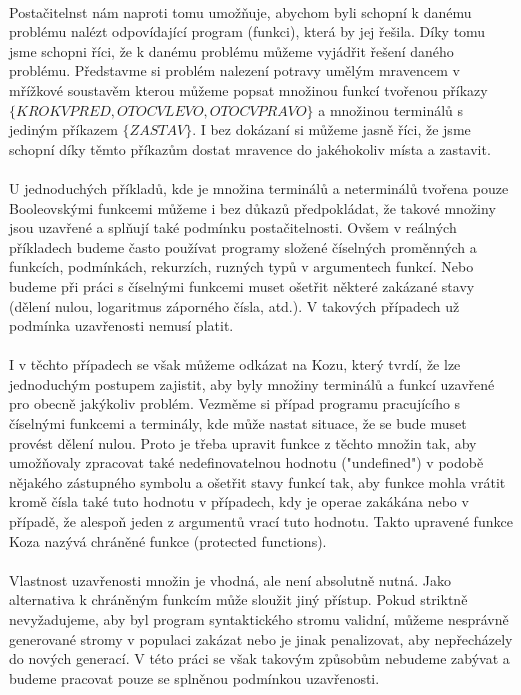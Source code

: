 \documentclass[bc,male,java,dept460]{diploma}		%
\begin{document}
\paragraph*{}
Postačitelnst nám naproti tomu umožňuje, abychom byli schopní k danému problému nalézt odpovídající program (funkci), která by jej řešila. Díky tomu jsme schopni říci, že k danému problému můžeme vyjádřit řešení daného problému. Představme si problém nalezení potravy umělým mravencem v mřížkové soustavěm kterou můžeme popsat množinou funkcí tvořenou příkazy $\{KROK VPRED, OTOC VLEVO, OTOC VPRAVO\}$ a množinou terminálů s jediným příkazem $\{ZASTAV\}$. I bez dokázaní si můžeme jasně říci, že jsme schopní díky těmto příkazům dostat mravence do jakéhokoliv místa a zastavit.

\paragraph*{}
U jednoduchých příkladů, kde je množina terminálů a neterminálů tvořena pouze Booleovskými funkcemi můžeme i bez důkazů předpokládat, že takové množiny jsou uzavřené a splňují také podmínku postačitelnosti. Ovšem v reálných příkladech budeme často používat programy složené číselných proměnných a funkcích, podmínkách, rekurzích, ruzných typů v argumentech funkcí. Nebo budeme při práci s číselnými funkcemi muset ošetřit některé zakázané stavy (dělení nulou, logaritmus záporného čísla, atd.). V takových případech už podmínka uzavřenosti nemusí platit.

\paragraph*{}
I v těchto případech se však můžeme odkázat na Kozu, který tvrdí, že lze jednoduchým postupem zajistit, aby byly množiny terminálů a funkcí uzavřené pro obecně jakýkoliv problém. Vezměme si případ programu pracujícího s číselnými funkcemi a terminály, kde může nastat situace, že se bude muset provést dělení nulou. Proto je třeba upravit funkce z těchto množin tak, aby umožňovaly zpracovat také nedefinovatelnou hodnotu ("undefined") v podobě nějakého zástupného symbolu a ošetřit stavy funkcí tak, aby funkce mohla vrátit kromě čísla také tuto hodnotu v případech, kdy je operae zakákána nebo v případě, že alespoň jeden z argumentů vrací tuto hodnotu. Takto upravené funkce Koza nazývá chráněné funkce (protected functions).

\paragraph*{}
Vlastnost uzavřenosti množin je vhodná, ale není absolutně nutná. Jako alternativa k chráněným funkcím může sloužit jiný přístup. Pokud striktně nevyžadujeme, aby byl program syntaktického stromu validní, můžeme nesprávně generované stromy v populaci zakázat nebo je jinak penalizovat, aby nepřecházely do nových generací. V této práci se však takovým způsobům nebudeme zabývat a budeme pracovat pouze se splněnou podmínkou uzavřenosti.
\end{document}
